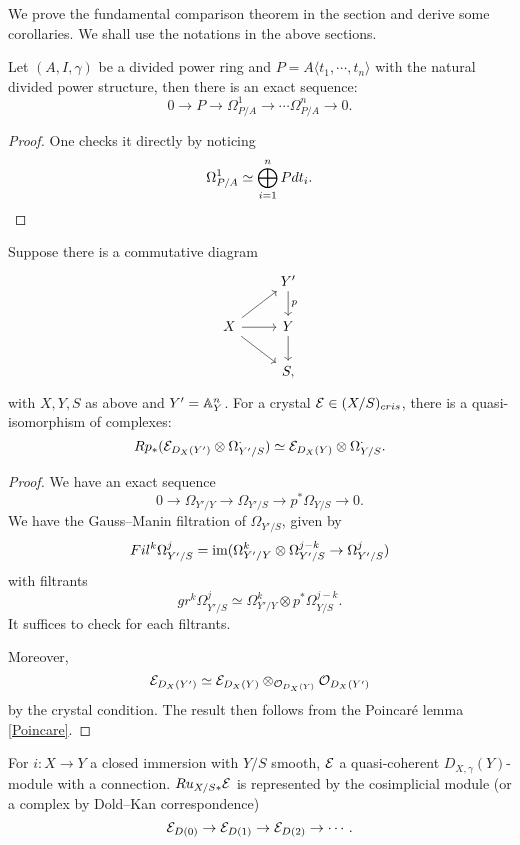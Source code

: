 We prove the fundamental comparison theorem in the section 
and derive some corollaries. 
We shall use the notations in the above sections.
\begin{lemma}
    \label{Poincare}
    Let $(A, I, \gamma)$ be a divided power ring and 
    $P = A \langle t_1, \cdots, t_n \rangle$ 
    with the natural divided power structure, 
    then there is an exact sequence:
    \[
        0 \to P \to \Omega_{P/A}^1 \to \cdots \Omega_{P/A}^n \to 0.
    \]
\end{lemma}

\begin{proof}
    One checks it directly by noticing
    \[
        \Omega_{P/A}^1 \simeq \bigoplus_{i = 1}^n Pdt_i.
        \qedhere
    \]
\end{proof}

\begin{lemma}
    \label{comparison}
    Suppose there is a commutative diagram 
    \[
        \begin{tikzcd}
            & Y'\ar[d,"p"] \\
            X \ar[r] \ar[ur] \ar[dr] & Y \ar[d] \\
            & S,
        \end{tikzcd}
    \]
    with $X, Y, S$ as above and $Y' = {\mathbb {A}}^n_Y$. 
    For a crystal ${\mathcal {E}} \in (X/S)_{cris}$, 
    there is a quasi-isomorphism of complexes:
    \[
        Rp_*({\mathcal {E}}_{D_X(Y')} \otimes \Omega_{Y'/S}^\cdot) 
        \simeq {\mathcal {E}}_{D_X(Y)} \otimes \Omega_{Y/S}^\cdot.
    \] 
\end{lemma}
\begin{proof}
    We have an exact sequence
    \[
        0 \to \Omega_{Y'/Y} \to 
        \Omega_{Y'/S} \to p^*\Omega_{Y/S} \to 0.
    \] 
    We have the Gauss--Manin filtration of $\Omega_{Y'/S}$, 
    given by 
    \[
        Fil^k\Omega_{Y'/S}^j = 
        \operatorname{im}(\Omega_{Y'/Y}^k \otimes \Omega_{Y'/S}^{j-k} \to \Omega_{Y'/S}^j)
    \]
    with filtrants 
    \[
        gr^k \Omega_{Y'/S}^j \simeq 
        \Omega_{Y'/Y}^k \otimes p^* \Omega_{Y/S}^{j-k}.
    \] 
    It suffices to check for each filtrants.

    Moreover,
    \[
        {\mathcal {E}}_{D_X(Y')} \simeq 
        {\mathcal {E}}_{D_X(Y)} \otimes_{{\mathcal {O}}_{D_X(Y)}} {\mathcal {O}}_{D_X(Y')}
    \]
    by the crystal condition. 
    The result then follows from the Poincar\'e lemma \ref{Poincare}.
\end{proof}

\begin{lemma}
    \label{Cech}
    For $i \colon X\to Y$ a closed immersion with $Y/S$ smooth, 
    ${\mathcal {E}}$ a quasi-coherent $D_{X,\gamma}(Y)$-module with a connection. 
    $Ru_{X/S*}{\mathcal {E}}$ is represented by the cosimplicial module 
    (or a complex by Dold--Kan correspondence)
    \[
        {\mathcal {E}}_{D(0)} \to {\mathcal {E}}_{D(1)} \to {\mathcal {E}}_{D(2)} \to \cdots.
    \]
\end{lemma}

